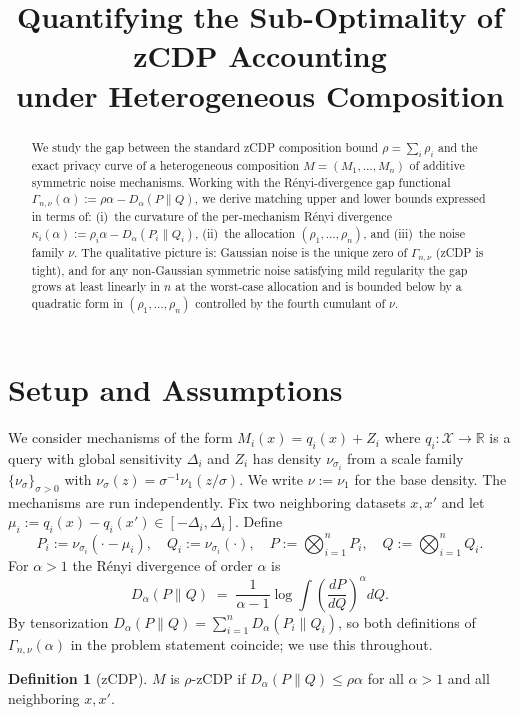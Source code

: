 \documentclass[11pt]{article}
\title{Quantifying the Sub-Optimality of zCDP Accounting \\ under Heterogeneous Composition}
\author{}
\date{}
\theoremstyle{definition}
\newtheorem{definition}[theorem]{Definition}
\newcommand{\R}{\mathbb{R}}
\begin{document}
\maketitle

\begin{abstract}
We study the gap between the standard zCDP composition bound $\rho=\sum_i \rho_i$ and the exact privacy curve of a heterogeneous composition $M=(M_1,\dots,M_n)$ of additive symmetric noise mechanisms. Working with the R\'enyi-divergence gap functional
$\Gamma_{n,\nu}(\alpha):=\rho\alpha-D_\alpha(P\|Q)$, we derive matching upper and lower bounds expressed in terms of: (i)~the curvature of the per-mechanism R\'enyi divergence $\kappa_i(\alpha):=\rho_i\alpha-D_\alpha(P_i\|Q_i)$, (ii)~the allocation $(\rho_1,\dots,\rho_n)$, and (iii)~the noise family $\nu$. The qualitative picture is: Gaussian noise is the unique zero of $\Gamma_{n,\nu}$ (zCDP is tight), and for any non-Gaussian symmetric noise satisfying mild regularity the gap grows at least linearly in $n$ at the worst-case allocation and is bounded below by a quadratic form in $(\rho_1,\dots,\rho_n)$ controlled by the fourth cumulant of $\nu$.
\end{abstract}

\section{Setup and Assumptions}

We consider mechanisms of the form $M_i(x)=q_i(x)+Z_i$ where $q_i:\mathcal{X}\to\R$ is a query with global sensitivity $\Delta_i$ and $Z_i$ has density $\nu_{\sigma_i}$ from a scale family $\{\nu_\sigma\}_{\sigma>0}$ with $\nu_\sigma(z)=\sigma^{-1}\nu_1(z/\sigma)$. We write $\nu:=\nu_1$ for the base density. The mechanisms are run independently. Fix two neighboring datasets $x,x'$ and let $\mu_i:=q_i(x)-q_i(x')\in[-\Delta_i,\Delta_i]$. Define
\[
P_i:=\nu_{\sigma_i}(\cdot-\mu_i),\quad Q_i:=\nu_{\sigma_i}(\cdot),\quad
P:=\bigotimes_{i=1}^n P_i,\quad Q:=\bigotimes_{i=1}^n Q_i.
\]
For $\alpha>1$ the R\'enyi divergence of order $\alpha$ is
\[
D_\alpha(P\|Q)\;=\;\frac{1}{\alpha-1}\log\!\int\!\left(\frac{dP}{dQ}\right)^{\!\alpha}dQ.
\]
By tensorization $D_\alpha(P\|Q)=\sum_{i=1}^n D_\alpha(P_i\|Q_i)$, so both definitions of $\Gamma_{n,\nu}(\alpha)$ in the problem statement coincide; we use this throughout.

\begin{definition}[zCDP]
$M$ is $\rho$-zCDP if $D_\alpha(P\|Q)\le \rho\alpha$ for all $\alpha>1$ and all neighboring $x,x'$.
\end{definition}
\end{document}

